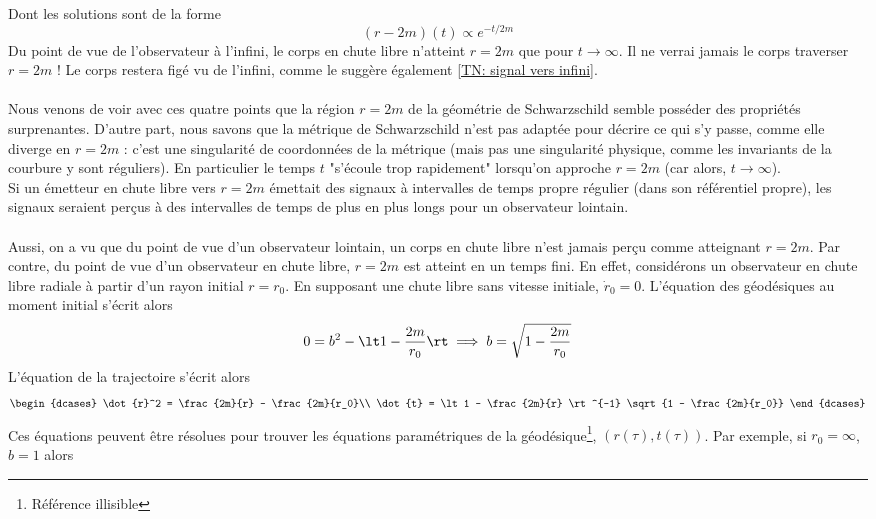 Dont les solutions sont de la forme
\begin{equation}
    (r-2m)(t) \propto e^{-t/2m}
\end{equation}
Du point de vue de l'observateur à l'infini, le corps en chute libre n'atteint $r=2m$ que pour $t \to \infty$. Il ne verrai jamais le corps traverser $r=2m$ ! Le corps restera figé vu de l'infini, comme le suggère également \ref{TN: signal vers infini}.\\
\\
Nous venons de voir avec ces quatre points que la région $r=2m$ de la géométrie de Schwarzschild semble posséder des propriétés surprenantes. D'autre part, nous savons que la métrique de Schwarzschild n'est pas adaptée pour décrire ce qui s'y passe, comme elle diverge en $r=2m$ : c'est une singularité de coordonnées de la métrique (mais pas une singularité physique, comme les invariants de la courbure y sont réguliers). En particulier le temps $t$ "s'écoule trop rapidement" lorsqu'on approche $r=2m$ (car alors, $t\to\infty$). \\
Si un émetteur en chute libre vers $r=2m$ émettait des signaux à intervalles de temps propre régulier (dans son référentiel propre), les signaux seraient perçus à des intervalles de temps de plus en plus longs pour un observateur lointain.\\
\\
Aussi, on a vu que du point de vue d'un observateur lointain, un corps en chute libre n'est jamais perçu comme atteignant $r=2m$. Par contre, du point de vue d'un observateur en chute libre, $r=2m$ est atteint en un temps fini. En effet, considérons un observateur en chute libre radiale à partir d'un rayon initial $r = r_0$. En supposant une chute libre sans vitesse initiale, $\dot{r}_0 = 0$. L'équation des géodésiques au moment initial s'écrit alors
\begin{equation}
    0 = b^2 - \lt 1 - \frac{2m}{r_0} \rt \implies b = \sqrt{1 - \frac{2m}{r_0}}
\end{equation}
L'équation de la trajectoire s'écrit alors
\begin{align}
    \begin{dcases}
        \dot{r}^2 = \frac{2m}{r} - \frac{2m}{r_0}\\
        \dot{t} = \lt 1 - \frac{2m}{r} \rt^{-1} \sqrt{1 - \frac{2m}{r_0}}
    \end{dcases}
\end{align}
Ces équations peuvent être résolues pour trouver les équations paramétriques de la géodésique\footnote{Référence illisible}, $(r(\tau),t(\tau))$. Par exemple, si $r_0 = \infty$, $b = 1$ alors
